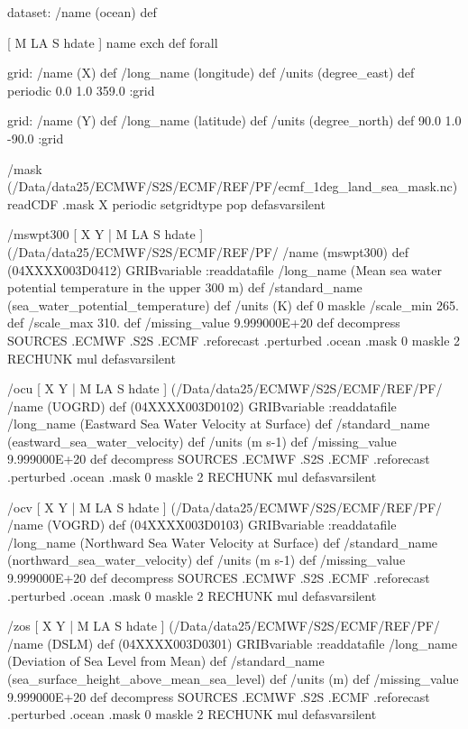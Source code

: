 \begin{ingrid}

dataset:
/name (ocean) def

[ M LA S hdate ] {name exch def } forall

grid:
/name (X) def
/long_name (longitude) def
/units (degree_east) def
periodic
0.0 1.0 359.0
:grid

grid:
/name (Y) def
/long_name (latitude) def
/units (degree_north) def
90.0 1.0 -90.0
:grid

/mask { (/Data/data25/ECMWF/S2S/ECMF/REF/PF/ecmf_1deg_land_sea_mask.nc) readCDF .mask
X periodic setgridtype pop
} defasvarsilent

/mswpt300 { [ X Y | M LA S hdate ] (/Data/data25/ECMWF/S2S/ECMF/REF/PF/%
/name (mswpt300) def
(04XXXX003D0412) GRIBvariable
:readdatafile
/long_name (Mean sea water potential temperature in the upper 300 m) def
/standard_name (sea_water_potential_temperature) def
/units (K) def
0 maskle
/scale_min 265. def
/scale_max 310. def
/missing_value 9.999000E+20 def
decompress
 SOURCES .ECMWF .S2S .ECMF .reforecast .perturbed .ocean .mask
  0 maskle
  2 RECHUNK
  mul
} defasvarsilent

/ocu { [ X Y | M LA S hdate ] (/Data/data25/ECMWF/S2S/ECMF/REF/PF/%
/name (UOGRD) def
(04XXXX003D0102) GRIBvariable
:readdatafile
/long_name (Eastward Sea Water Velocity at Surface) def
/standard_name (eastward_sea_water_velocity) def
/units (m s-1) def
/missing_value 9.999000E+20 def
decompress
  SOURCES .ECMWF .S2S .ECMF .reforecast .perturbed .ocean .mask
  0 maskle
  2 RECHUNK
  mul
} defasvarsilent

/ocv { [ X Y | M LA S hdate ] (/Data/data25/ECMWF/S2S/ECMF/REF/PF/%
/name (VOGRD) def
(04XXXX003D0103) GRIBvariable
:readdatafile
/long_name (Northward Sea Water Velocity at Surface) def
/standard_name (northward_sea_water_velocity) def
/units (m s-1) def
/missing_value 9.999000E+20 def
decompress
  SOURCES .ECMWF .S2S .ECMF .reforecast .perturbed .ocean .mask
  0 maskle
  2 RECHUNK
  mul
} defasvarsilent

/zos { [ X Y | M LA S hdate ] (/Data/data25/ECMWF/S2S/ECMF/REF/PF/%
/name (DSLM) def
(04XXXX003D0301) GRIBvariable
:readdatafile
/long_name (Deviation of Sea Level from Mean) def
/standard_name (sea_surface_height_above_mean_sea_level) def
/units (m) def
/missing_value 9.999000E+20 def
decompress
  SOURCES .ECMWF .S2S .ECMF .reforecast .perturbed .ocean .mask
  0 maskle
  2 RECHUNK
  mul
} defasvarsilent


\end{ingrid}

